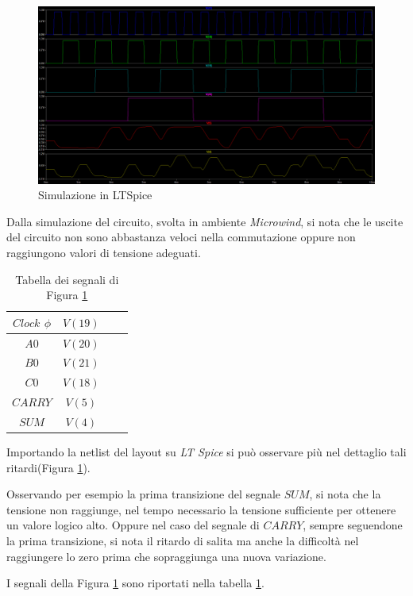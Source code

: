 \documentclass[11pt]{article} %
\begin{document}
\begin{figure} [h!]
  \includegraphics[width=\linewidth]{Vecchio.png}
  \caption{Simulazione in LTSpice}
  \label{fig:LT1}
\end{figure}


Dalla simulazione del circuito, svolta in ambiente \emph{Microwind}, si nota che le uscite del circuito non sono abbastanza veloci nella commutazione oppure non raggiungono valori di tensione adeguati.


\begin {table} [h!]
\begin{tabular}{|c|c|c|c|}
\hline
$ Clock$ $\phi$ & $V(19)$\\
\hline
$A0$ & $V(20)$ \\
\hline
$B0$ & $V(21)$\\
\hline
$C0$ &  $V(18)$  \\
\hline
$CARRY$ & $V(5)$  \\
\hline
$SUM$ & $V(4)$ \\
\hline
\end{tabular}
\caption{Tabella dei segnali di Figura \ref{fig:LT1}}
\label{table:1}
\end{table}

Importando la netlist del layout su \emph{LT Spice} si può osservare più nel dettaglio tali ritardi(Figura \ref{fig:LT1}).


Osservando per esempio la prima transizione del segnale $SUM$, si nota che la tensione non raggiunge, nel tempo necessario la tensione sufficiente per ottenere un valore logico alto.
Oppure nel caso del segnale di $CARRY$, sempre seguendone la prima transizione, si nota il ritardo di salita ma anche la difficoltà nel raggiungere lo zero prima che sopraggiunga una nuova variazione.

I segnali della Figura \ref{fig:LT1}  sono riportati nella tabella  \ref{table:1}.
\end{document}
